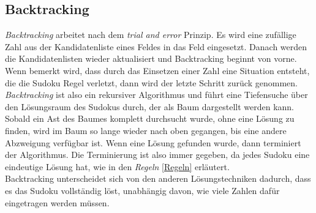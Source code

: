 \newpage
\subsection{Backtracking}
\label{Backtracking}
\textit{Backtracking} arbeitet nach dem \textit{trial and error} Prinzip. Es wird eine zufällige Zahl aus der Kandidatenliste eines Feldes in das Feld eingesetzt. Danach werden die Kandidatenlisten wieder aktualisiert und Backtracking beginnt von vorne. Wenn bemerkt wird, dass durch das Einsetzen einer Zahl eine Situation entsteht, die die Sudoku Regel verletzt, dann wird der letzte Schritt zurück genommen. \textit{Backtracking} ist also ein rekursiver Algorithmus und führt eine Tiefensuche über den Lösungsraum des Sudokus durch, der als Baum dargestellt werden kann. Sobald ein Ast des Baumes komplett durchsucht wurde, ohne eine Lösung zu finden, wird im Baum so lange wieder nach oben gegangen, bis eine andere Abzweigung verfügbar ist. Wenn eine Lösung gefunden wurde, dann terminiert der Algorithmus. Die Terminierung ist also immer gegeben, da jedes Sudoku eine eindeutige Lösung hat, wie in den \textit{Regeln} \ref{Regeln} erläutert.\\
Backtracking unterscheidet sich von den anderen Lösungstechniken dadurch, dass es das Sudoku vollständig löst, unabhängig davon, wie viele Zahlen dafür eingetragen werden müssen.